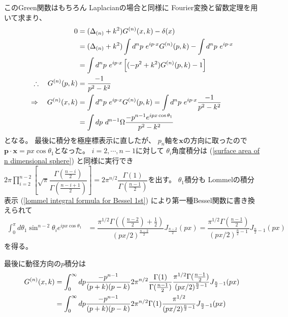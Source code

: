 このGreen関数はもちろん
Laplacianの場合と同様に
Fourier変換と留数定理を用いて求まり、
\begin{align}
    0
&=
    (\Delta_{(n)} + k^2)
    G^{(n)}( \bm{x}, k )
    -
    \delta( \bm{x} )
\notag\\&
=
    (\Delta_{(n)} + k^2)
    \int d^n p\ 
        e^{i \bm{p} \cdot \bm{x}}
        G^{(n)}( \bm{p}, k )
    -
    \int d^n p\ 
        e^{i \bm{p} \cdot \bm{x}}
\notag\\&
=
    \int d^n p\ 
        e^{i \bm{p} \cdot \bm{x}}
    \left[
        (- \bm{p}^2 + k^2)
        G^{(n)}( \bm{p}, k )
    - 1
    \right]
\notag\\\therefore\quad
    G^{(n)}( \bm{p}, k )
&=
    \dfrac{- 1}{\bm{p}^2 - k^2}
\notag\\\Rightarrow\quad
    G^{(n)}( \bm{x}, k )
&=
    \int d^n p\ 
        e^{i \bm{p} \cdot \bm{x}}
        G^{(n)}( \bm{p}, k )
=
    \int d^n p\ 
        e^{i \bm{p} \cdot \bm{x}}
        \dfrac{- 1}{\bm{p}^2 - k^2}
\notag\\&
=
    \int d p\ 
    d^{n-1} \Omega
        \dfrac{
            - p^{n-1}
            e^{i p x \cos \theta_1}
        }{p^2 - k^2}
\end{align}
となる。
最後に積分を極座標表示に直したが、
$p_n$軸を$\bm{x}$の方向に取ったので
$\bm{p} \cdot \bm{x} = px \cos \theta_1$となった。
$i = 2, \cdots, n-1$に対して
$\theta_i$角度積分は
(\ref{surface area of n dimensional sphere})
と同様に実行でき$\displaystyle
2 \pi
\prod_{i=2}^{n-2}
\left[
    \sqrt{\pi}
    \dfrac{\Gamma(\frac{n - i}{2})}
    {\Gamma(\frac{n - i + 1}{2})}
\right]
=
2 \pi^{n/2}
    \dfrac{ \Gamma(1) }{ \Gamma(\frac{n-1}{2}) }
$を出す。
$\theta_1$積分も
Lommelの積分表示
(\ref{lommel integral formula for Bessel 1st})
により第一種Bessel関数に書き換えられて
\begin{align}
    \int_0^\pi d \theta_1
        \sin^{n-2} \theta_i
        e^{i p x \cos \theta_1}
&=
    \dfrac{
        \pi^{1/2}
        \Gamma(
            (\frac{n-2}{2})
            + \frac{1}{2}
        )
    } { (px/2)^{ \frac{n-2}{2} } }
    J_{ \frac{n-2}{2} } (px)
=
    \dfrac{
        \pi^{1/2}
        \Gamma(
            \frac{n-1}{2}
        )
    } { (px/2)^{ \frac{n}{2} - 1 } }
    J_{ \frac{n}{2} - 1 } (px)
\end{align}
を得る。

最後に動径方向の$p$積分は
\begin{align}
    G^{(n)}( x, k )
&=
    \int_0^\infty d p
        \dfrac{
            - p^{n-1}
        }{(p + k)(p - k)}
    2 \pi^{n/2}
        \dfrac{ \Gamma(1) }
            { \Gamma(\frac{n-1}{2}) }
    \dfrac{
        \pi^{1/2}
        \Gamma(
            \frac{n-1}{2}
        )
    } { (px/2)^{ \frac{n}{2} - 1 } }
    J_{ \frac{n}{2} - 1 } (px)
\notag\\&
=
    \int_0^\infty d p
        \dfrac{
            - p^{n-1}
        }{(p + k)(p - k)}
    2 \pi^{n/2}
        \Gamma(1)
    \dfrac{
        \pi^{1/2}
    } { (px/2)^{ \frac{n}{2} - 1 } }
    J_{ \frac{n}{2} - 1 } (px)
\end{align}

